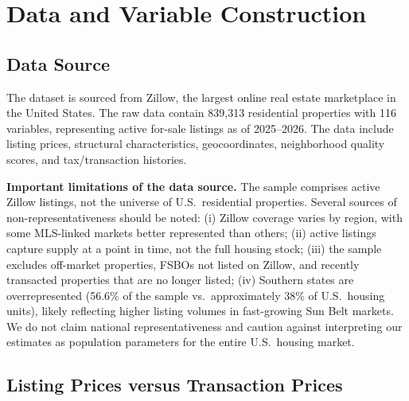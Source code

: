 %
\section{Data and Variable Construction}
\label{sec:data}

\subsection{Data Source}

The dataset is sourced from Zillow, the largest online real estate marketplace in the United States. The raw data contain 839,313 residential properties with 116 variables, representing active for-sale listings as of 2025--2026. The data include listing prices, structural characteristics, geocoordinates, neighborhood quality scores, and tax/transaction histories.

\textbf{Important limitations of the data source.} The sample comprises active Zillow listings, not the universe of U.S.\ residential properties. Several sources of non-representativeness should be noted: (i) Zillow coverage varies by region, with some MLS-linked markets better represented than others; (ii) active listings capture supply at a point in time, not the full housing stock; (iii) the sample excludes off-market properties, FSBOs not listed on Zillow, and recently transacted properties that are no longer listed; (iv) Southern states are overrepresented (56.6\% of the sample vs.\ approximately 38\% of U.S.\ housing units), likely reflecting higher listing volumes in fast-growing Sun Belt markets. We do not claim national representativeness and caution against interpreting our estimates as population parameters for the entire U.S.\ housing market.

\subsection{Listing Prices versus Transaction Prices}

